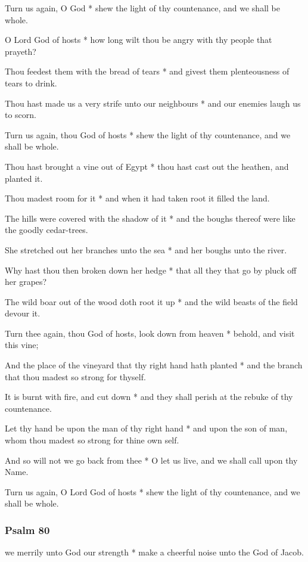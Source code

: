 Turn us again, O God * shew the light of thy countenance, and we shall be whole.

O Lord God of hosts * how long wilt thou be angry with thy people that prayeth?

Thou feedest them with the bread of tears * and givest them plenteousness of tears to drink.

Thou hast made us a very strife unto our neighbours * and our enemies laugh us to scorn.

Turn us again, thou God of hosts * shew the light of thy countenance, and we shall be whole.

Thou hast brought a vine out of Egypt * thou hast cast out the heathen, and planted it.

Thou madest room for it * and when it had taken root it filled the land.

The hills were covered with the shadow of it * and the boughs thereof were like the goodly cedar-trees.

She stretched out her branches unto the sea * and her boughs unto the river.

Why hast thou then broken down her hedge * that all they that go by pluck off her grapes?

The wild boar out of the wood doth root it up * and the wild beasts of the field devour it.

Turn thee again, thou God of hosts, look down from heaven * behold, and visit this vine;

And the place of the vineyard that thy right hand hath planted * and the branch that thou madest so strong for thyself.

It is burnt with fire, and cut down * and they shall perish at the rebuke of thy countenance.

Let thy hand be upon the man of thy right hand * and upon the son of man, whom thou madest so strong for thine own self.

And so will not we go back from thee * O let us live, and we shall call upon thy Name.

Turn us again, O Lord God of hosts * shew the light of thy countenance, and we shall be whole.

\subsubsection{Psalm 80}


 we merrily unto God our strength * make a cheerful noise unto the God of Jacob.

